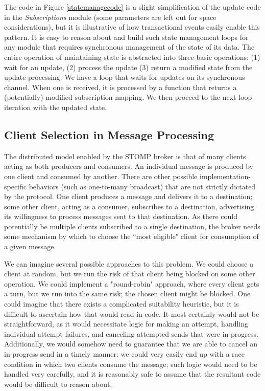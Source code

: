 \documentclass[conference, letterpaper]{IEEEtran}
\begin{document}
The code in Figure \ref{statemanagecode} is a slight simplification of the update code in the \textit{Subscriptions} module (some parameters are left out for space considerations), but it is illustrative of how transactional events easily enable this pattern. It is easy to reason about and build such state management loops for any module that requires synchronous management of the state of its data. The entire operation of maintaining state is abstracted into three basic operations: (1) wait for an update, (2) process the update  (3) return a modified state from the update processing. We have a loop that waits for updates on its synchronous channel. When one is received, it is processed by a function that returns a (potentially) modified subscription mapping. We then proceed to the next loop iteration with the updated state.

\subsection{Client Selection in Message Processing}

The distributed model enabled by the STOMP broker is that of many clients acting as both producers and consumers. An individual message is produced by one client and consumed by another. There are other possible implementation-specific behaviors (such as one-to-many broadcast) that are not strictly dictated by the protocol. One client produces a message and delivers it to a destination; some other client, acting as a consumer, subscribes to a destination, advertising its willingness to process messages sent to that destination. As there could potentially be multiple clients subscribed to a single destination, the broker needs some mechanism by which to choose the ``most eligible" client for consumption of a given message. 

We can imagine several possible approaches to this problem. We could choose a client at random, but we run the risk of that client being blocked on some other operation. We could implement a "round-robin" approach, where every client gets a turn, but we run into the same risk; the chosen client might be blocked. One could imagine that there exists a complicated suitability heuristic, but it is difficult to ascertain how that would read in code. It most certainly would not be straightforward, as it would necessitate logic for making an attempt, handling individual attempt failures, and canceling attempted sends that were in-progress. Additionally, we would somehow need to guarantee that we are able to cancel an in-progress send in a timely manner: we could very easily end up with a race condition in which two clients consume the message; such logic would need to be handled very carefully, and it is reasonably safe to assume that the resultant code would be difficult to reason about.
\end{document}
